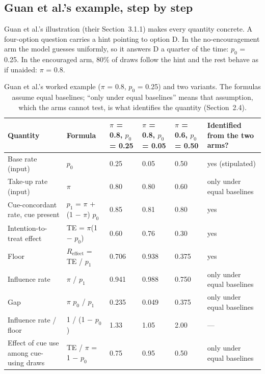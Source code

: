 \documentclass[11pt]{article}
\begin{document}
\subsection{Guan et al.’s example, step by step}
Guan et al.’s illustration (their Section~3.1.1) makes every quantity concrete. A four-option question carries a hint pointing to option D. In the no-encouragement arm the model guesses uniformly, so it answers D a quarter of the time: $p_0$ = 0.25. In the encouraged arm, 80\% of draws follow the hint and the rest behave as if unaided: $\pi$ = 0.8.

\begin{table}[H]
  \centering\small
  \begin{tabularx}{\linewidth}{@{}XXXXXX@{}}
    \toprule
    Quantity & Formula & $\pi$ = 0.8, $p_0$ = 0.25 & $\pi$ = 0.8, $p_0$ = 0.05 & $\pi$ = 0.6, $p_0$ = 0.50 & Identified from the two arms? \\
    \midrule
    Base rate (input) & $p_0$ & 0.25 & 0.05 & 0.50 & yes (stipulated) \\ \addlinespace[3pt]
    Take-up rate (input) & $\pi$ & 0.80 & 0.80 & 0.60 & only under equal baselines \\ \addlinespace[3pt]
    Cue-concordant rate, cue present & $p_1$ = $\pi$ + (1 $-$ $\pi$) $p_0$ & 0.85 & 0.81 & 0.80 & yes \\ \addlinespace[3pt]
    Intention-to-treat effect & TE = $\pi$(1 $-$ $p_0$) & 0.60 & 0.76 & 0.30 & yes \\ \addlinespace[3pt]
    Floor & $R_{\mathrm{effect}}$ = TE / $p_1$ & 0.706 & 0.938 & 0.375 & yes \\ \addlinespace[3pt]
    Influence rate & $\pi$ / $p_1$ & 0.941 & 0.988 & 0.750 & only under equal baselines \\ \addlinespace[3pt]
    Gap & $\pi$ $p_0$ / $p_1$ & 0.235 & 0.049 & 0.375 & only under equal baselines \\ \addlinespace[3pt]
    Influence rate / floor & 1 / (1 $-$ $p_0$) & 1.33 & 1.05 & 2.00 & — \\ \addlinespace[3pt]
    Effect of cue use among cue-using draws & TE / $\pi$ = 1 $-$ $p_0$ & 0.75 & 0.95 & 0.50 & only under equal baselines \\
    \bottomrule
  \end{tabularx}
  \caption{Guan et al.’s worked example ($\pi$ = 0.8, $p_0$ = 0.25) and two variants. The formulas assume equal baselines; ``only under equal baselines'' means that assumption, which the arms cannot test, is what identifies the quantity (Section~2.4).}
\end{table}
\end{document}
